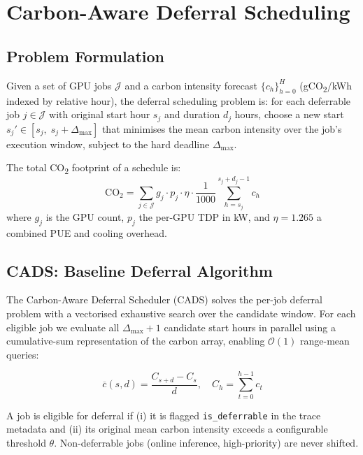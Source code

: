 ﻿\section{Carbon-Aware Deferral Scheduling}
\label{sec:cads}

\subsection{Problem Formulation}

Given a set of GPU jobs $\mathcal{J}$ and a carbon intensity forecast
$\{c_h\}_{h=0}^{H}$ (gCO\textsubscript{2}/kWh indexed by relative hour),
the deferral scheduling problem is: for each deferrable job $j \in \mathcal{J}$
with original start hour $s_j$ and duration $d_j$ hours, choose a new start
$s_j' \in [s_j,\; s_j + \Delta_{\max}]$ that minimises the mean carbon intensity
over the job's execution window, subject to the hard deadline $\Delta_{\max}$.

The total CO\textsubscript{2} footprint of a schedule is:
\begin{equation}
  \text{CO}_2 = \sum_{j \in \mathcal{J}} g_j \cdot p_j \cdot \eta
    \cdot \frac{1}{1000}\sum_{h=s_j}^{s_j + d_j - 1} c_h
  \label{eq:co2}
\end{equation}
where $g_j$ is the GPU count, $p_j$ the per-GPU TDP in kW, and
$\eta = 1.265$ a combined PUE and cooling overhead.

\subsection{CADS: Baseline Deferral Algorithm}

The Carbon-Aware Deferral Scheduler (CADS) solves the per-job deferral
problem with a vectorised exhaustive search over the candidate window.
For each eligible job we evaluate all $\Delta_{\max}+1$ candidate start hours
in parallel using a cumulative-sum representation of the carbon array,
enabling $\mathcal{O}(1)$ range-mean queries:

\begin{equation}
  \overline{c}(s, d) = \frac{C_{s+d} - C_s}{d}, \quad
  C_h = \sum_{t=0}^{h-1} c_t
  \label{eq:cumsum}
\end{equation}

A job is eligible for deferral if (i) it is flagged \texttt{is\_deferrable}
in the trace metadata and (ii) its original mean carbon intensity exceeds a
configurable threshold $\theta$.  Non-deferrable jobs (online inference,
high-priority) are never shifted.

